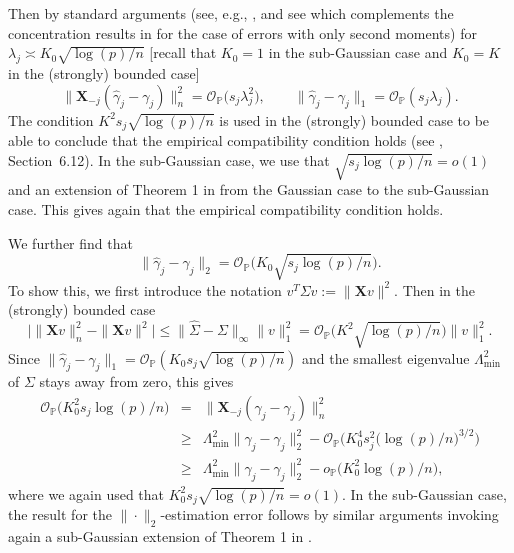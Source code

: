 \documentclass[aos,MSNbibl,dvips]{arximspdf}
\newcommand{\PP}{\mathbb{P}}
\newcommand{\bx}{\mathbf{X}}
\begin{document}
Then by standard arguments (see, e.g., \cite{brt09}, and see \cite{pbvdg11}
which complements the concentration results in \cite{lederer11} for the
case of errors with only second moments) for $\lambda_j\asymp K_0
\sqrt
{\log(p)/ n } $ [recall that
$K_0 =1$ in the sub-Gaussian case and $K_0 = K$ in the (strongly)
bounded case]
%
\[
\bigl\| \bx_{-j} ( \hat\gamma_j - \gamma_{j} )
\bigr\|_n^2 = {\mathcal O}_{\PP} \bigl(s_j
\lambda_j^2 \bigr),\qquad \| \hat\gamma_j -
\gamma_{j} \|_1 = {\mathcal O}_{\PP} (
s_j \lambda_j ). %
\]
%
The condition $K^2 s_j \sqrt{ \log(p)/ n }$ is used in the (strongly)
bounded case to be able to conclude
that the empirical compatibility condition holds (see \cite{pbvdg11},
Section~6.12).
In the sub-Gaussian case, we use that $\sqrt{s_j \log(p)/n } = o(1)$
and an extension of Theorem 1 in \cite{raskutti2010restricted} from
the Gaussian case
to the sub-Gaussian case. This gives again that the empirical
compatibility condition holds.

We further find that
%
\[
\| \hat\gamma_j - \gamma_j \|_2 = {
\mathcal O}_{\PP} \bigl( K_0 \sqrt{s_j \log(p)/
n } \bigr). %
\]
%
To show this, we first introduce the notation $v^T \Sigma v:= \| \bx v
\|^2$. Then in the (strongly) bounded case
%
\[
\bigl| \| \bx v \|_n^2 - \| \bx v \|^2 \bigr| \le\|
\hat\Sigma- \Sigma\|_{\infty} \| v \|_1^2 = {
\mathcal O}_{\PP} \bigl( K^2 \sqrt{\log(p)/ n } \bigr) \| v
\|_1^2.
\]
%
Since $\| \hat\gamma_j - \gamma_j \|_1 = {\mathcal O}_{\PP} ( K_0s_j
\sqrt{\log(p)/ n } )$
and the smallest eigenvalue $\Lambda_\mathrm{min}^2 $ of $\Sigma$ stays away
from zero, this gives
%
\begin{eqnarray*}
{\mathcal O}_{\PP} \bigl( K_0^2
s_j \log(p)/ n\bigr)& =& \bigl\| \bx_{-j} ( \hat
\gamma_j - \gamma_j ) \bigr\|_n^2
\\
&\ge& \Lambda_\mathrm{min}^2 \| \hat\gamma_j -
\gamma_j \|_2^2 - {\mathcal O}_{\PP}
\bigl( K_0^4 s_j ^2 \bigl(
\log(p)/ n \bigr)^{3/2} \bigr)
\\
&\ge& \Lambda_\mathrm{min}^2 \| \hat\gamma_j -
\gamma_j \|_2^2 - o_{\PP}
\bigl(K_0^2 \log(p)/ n \bigr),
\end{eqnarray*}
%
where we again used that $K_0^2 s_j \sqrt{\log(p)/ n} = o(1)$.
In the sub-Gaussian case, the result for the $\| \cdot\|
_2$-estimation error follows by similar arguments invoking again
a sub-Gaussian extension of Theorem 1 in \cite{raskutti2010restricted}.
\end{document}
